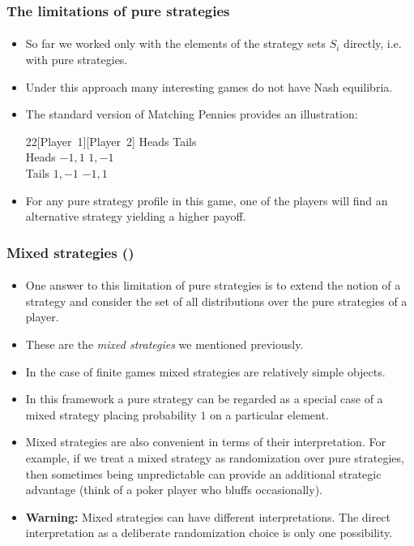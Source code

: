 \documentclass[10pt]{beamer}
\theoremstyle{definition}
\begin{document}
\begin{frame}[fragile]
\frametitle{The limitations of pure strategies}
\framesubtitle{}
\begin{itemize}\itemsep1em
\item So far we worked only with the elements of the strategy sets $ S_i $ directly, i.e. with pure strategies.
\item Under this approach many interesting games do not have Nash equilibria.
\item The standard version of Matching Pennies provides an illustration:
\begin{center}
\begin{game}{2}{2}[Player~1][Player~2]
 \> Heads \> Tails \\
Heads \> $ -1,1 $ \> $ 1,-1 $ \\
Tails \> $ 1,-1 $ \> $ -1,1 $
\end{game}
\end{center}\bigskip
\item For any pure strategy profile in this game, one of the players will find an alternative strategy yielding a higher payoff.
\end{itemize}
\end{frame}

\setcounter{slidenum}{1}
\begin{frame}[fragile]
\frametitle{Mixed strategies ()}
\framesubtitle{}
\begin{itemize}\itemsep1em
\item One answer to this limitation of pure strategies is to extend the notion of a strategy and consider the set of all distributions over the pure strategies of a player. 
\item These are the \emph{mixed strategies} we mentioned previously.
\item In the case of finite games mixed strategies are relatively simple objects.
\item In this framework a pure strategy can be regarded as a special case of a mixed strategy placing probability $ 1 $ on a particular element.
\item Mixed strategies are also convenient in terms of their interpretation. For example, if we treat a mixed strategy as randomization over pure strategies, then sometimes being unpredictable can provide an additional strategic advantage (think of a poker player who bluffs occasionally).
\item \textbf{Warning:} Mixed strategies can have different interpretations. The direct interpretation as a deliberate randomization choice is only one possibility.
\end{itemize}
\end{frame}
\end{document}
